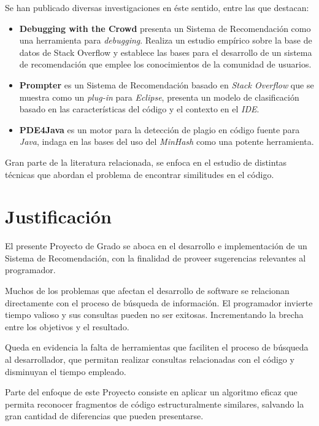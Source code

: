 Se han publicado diversas investigaciones en éste sentido, entre las que destacan:

\begin{itemize}
	\item \textbf{Debugging with the Crowd}\cite{monperrus:hal-00987395}
	presenta un Sistema de Recomendación como una herramienta para \textit{debugging}.
	Realiza un estudio empírico sobre la base de datos de Stack Overflow y establece las bases
	para el desarrollo de un sistema de recomendación que emplee los conocimientos de la comunidad de usuarios.
	
	\item \textbf{Prompter}\cite{Ponzanelli:2014:PSR:2705615.2706035} es un Sistema de Recomendación
	basado en \textit{Stack Overflow} que se muestra como un \textit{plug-in} para \textit{Eclipse},
	presenta un modelo de clasificación basado en las características del código y el contexto en
	el \textit{IDE}.

	\item \textbf{PDE4Java}\cite{Jadalla:2008:PPD:1413814.1413815} es un motor 
	para la detección de plagio en código fuente para \textit{Java}, indaga en
	las bases del uso del \textit{MinHash} como una potente herramienta.
\end{itemize}

Gran parte de la literatura relacionada, se enfoca en el estudio de distintas técnicas
que abordan el problema de encontrar similitudes en el código.

\section*{Justificación}

El presente Proyecto de Grado se aboca en el desarrollo e implementación de 
un Sistema de Recomendación, con la finalidad de proveer sugerencias 
relevantes al programador.

Muchos de los problemas que afectan el desarrollo de software se relacionan
directamente con el proceso de búsqueda de información. El programador
invierte tiempo valioso y sus consultas pueden no ser exitosas.
Incrementando la brecha entre los objetivos y el resultado.

Queda en evidencia la falta de herramientas
que faciliten el proceso de búsqueda al desarrollador,
que permitan realizar consultas relacionadas con el código
y disminuyan el tiempo empleado.

Parte del enfoque de este Proyecto consiste en aplicar un algoritmo
eficaz que permita reconocer fragmentos de código estructuralmente similares,
salvando la gran cantidad de diferencias que pueden presentarse.

